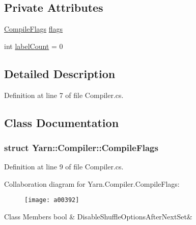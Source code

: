 \subsection*{Private Attributes}
\begin{DoxyCompactItemize}
\item 
\hyperlink{a00056_a00378}{Compile\-Flags} \hyperlink{a00056_a541022d89bcf9bc8f794eb6d6b438d08}{flags}
\item 
int \hyperlink{a00056_a87758397eba2e84cda8e0d6c40656f3f}{label\-Count} = 0
\end{DoxyCompactItemize}


\subsection{Detailed Description}


Definition at line 7 of file Compiler.\-cs.



\subsection{Class Documentation}
\label{a00378}
\hypertarget{a00056_a00378}{}
\subsubsection{struct Yarn\-:\-:Compiler\-:\-:Compile\-Flags}


Definition at line 9 of file Compiler.\-cs.



Collaboration diagram for Yarn.\-Compiler.\-Compile\-Flags\-:
\nopagebreak
\begin{figure}[H]
\begin{center}
\leavevmode
\texttt{[image: a00392]}
\end{center}
\end{figure}
\begin{DoxyFields}{Class Members}
\hypertarget{a00056_a8b49bb7763ff477cba21d7c771ef3ed0}{bool}\label{a00056_a8b49bb7763ff477cba21d7c771ef3ed0}
&
Disable\-Shuffle\-Options\-After\-Next\-Set&
\\
\hline

\end{DoxyFields}


